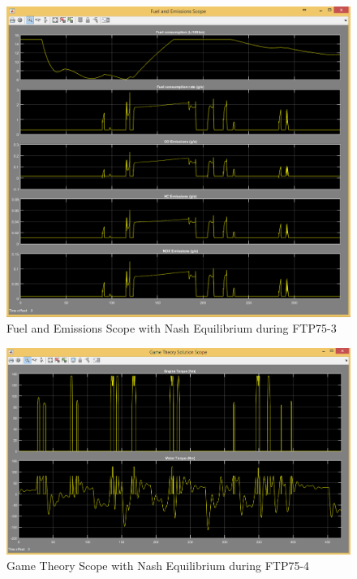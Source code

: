 \begin{figure}[h]
\centering
\includegraphics[scale=0.4]{figures/NashEquilibrium/FTP75-3/fuelEmissions15Juni}
\caption{Fuel and Emissions Scope with Nash Equilibrium during FTP75-3}
\label{fig:fene3}
\end{figure}


\begin{figure}[h]
\centering
\includegraphics[scale=0.4]{figures/NashEquilibrium/FTP75-4/gameTheory15Juni}
\caption{Game Theory Scope with Nash Equilibrium during FTP75-4}
\label{fig:gtne4}
\end{figure}

